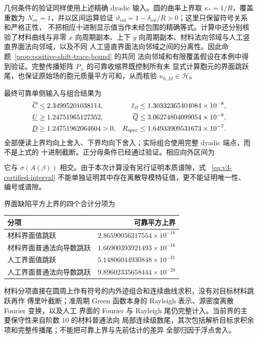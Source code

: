 几何条件的验证同样使用上述精确 dyadic 输入。圆的曲率上界取
$\kappa_*=1/R$，覆盖重数为 $N_{\mathrm{ov}}=1$，并以区间运算验证
$\vartheta_{\mathrm{col}}=1-\delta_{\mathrm{col}}/R>0$；这里只保留符号关系和严格正性，
不把相应十进制显示值当作未经包围的精确等式。计算中还分别核验了材料曲线与非零
$x$ 向周期副本、上下 $y$ 向周期副本、材料法向邻域与人工竖直界面法向邻域，以及不同
人工竖直界面法向邻域之间的分离性。因此命题~\ref{prop:positive-shift-trace-bound} 的共同
法向邻域和有限覆盖假设在本例中得到验证。完整传播矩阵 $P_\pm$ 的可靠收缩界既控制所有未
显式计算胞元的界面跳跃尾，也保证原始场的胞元质量平方可和，从而核验
$u_{h,M}\in\mathcal H$。

最终可靠单侧输入与组合结果为
\begin{align}
  \overline C
  &\leq2.34995201038114,
  &\overline\varepsilon_\partial
  &\leq1.30332365404084\times10^{-8},
  \notag\\
  \underline U
  &\geq1.24751965127352,
  &\overline Q
  &\leq3.06274804099054\times10^{-8},
  \notag\\
  \underline D
  &\geq1.24751962064604>0,
  &R_{\mathrm{spec}}
  &\leq1.64933909531673\times10^{-7}.
  \label{eq:v3-certified-summary}
\end{align}
全部便读上界均向上舍入、下界均向下舍入；实际组合使用完整 dyadic 端点，而不是上式的
十进制截断。正分母条件已经通过验证。相应向外区间为
\begin{align}
  [3.359046767703687789,\;3.359047097571506853],
  \label{eq:v3-certified-interval}
\end{align}
它与 $\sigma(A(\beta))$ 相交。由于本次计算没有另行证明本质谱隙，式
~\eqref{eq:v3-certified-interval} 不能单独证明其中存在离散导模特征值，更不能证明唯一性、
编号或谱隙。

界面缺陷平方上界的四个合计分项为
\begin{center}
  \begin{tabular}{lr}
    \hline
    分项 & 可靠平方上界\\
    \hline
    材料界面值跳跃
      & $2.86590056317554\times10^{-18}$\\
    材料界面普通法向导数跳跃
      & $1.66900393921493\times10^{-16}$\\
    人工界面值跳跃
      & $5.14806044930848\times10^{-31}$\\
    人工界面普通法向导数跳跃
      & $9.89602335658444\times10^{-20}$\\
    \hline
  \end{tabular}
\end{center}
材料分项直接在圆周上作有符号的内外迹组合和连续曲线求积，没有对目标材料跳跃再作
傅里叶截断；准周期 Green 函数本身的 Rayleigh 表示、源密度离散 Fourier 变换，以及人工
界面的 Fourier 与 Rayleigh 尾仍完整计入。当前界的主要保守性来自阶数 10 的材料普通法向
局部连续级数尾，其次包括解析目标求积余项和完整传播尾；不能把可靠上界与先前估计的差异
全部归因于浮点舍入。

